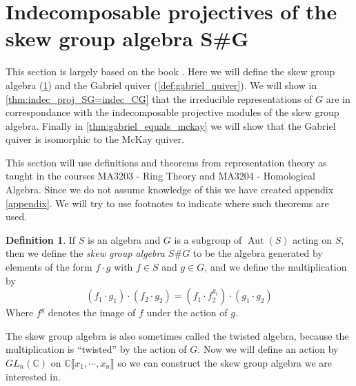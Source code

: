 \documentclass[11pt, a4paper, english]{article}
\theoremstyle{definition}
\newtheorem{defin}[theorem]{Definition}
\newcommand{\C}{\mathbb{C}}
\DeclareMathOperator{\Aut}{Aut}
\begin{document}
\section{Indecomposable projectives of the skew group algebra S\#G}
This section is largely based on the book \cite{CMR}. Here we will define the skew group algebra (\cref{def:skew_group_algebra}) and the Gabriel quiver (\cref{def:gabriel_quiver}). We will show in \cref{thm:indec_proj_SG=indec_CG} that the irreducible representations of $G$ are in correspondance with the indecomposable projective modules of the skew group algebra. Finally in \cref{thm:gabriel_equals_mckay} we will show that the Gabriel quiver is isomorphic to the McKay quiver.

This section will use definitions and theorems from representation theory as taught in the courses MA3203 - Ring Theory and MA3204 - Homological Algebra. Since we do not assume knowledge of this we have created appendix \ref{appendix}. We will try to use footnotes to indicate where such theorems are used.

\begin{defin}
\label{def:skew_group_algebra}
If $S$ is an algebra and $G$ is a subgroup of $\Aut(S)$ acting on $S$, then we define the \textit{skew group algebra $S\#G$} to be the algebra generated by elements of the form $f \cdot g$ with $f \in S$ and $g \in G$, and we define the multiplication by
$$ (f_1 \cdot g_1) \cdot (f_2 \cdot g_2) = (f_1 \cdot f_2^{g_1}) \cdot (g_1 \cdot g_2) $$
Where $f^g$ denotes the image of $f$ under the action of $g$.
\iffalse
If $G$ is a subgroup of $GL_n(\C)$, we can extend the group action of $G$ on $\C^n$ to $\C\llbracket x_1, \cdots, x_n\rrbracket$. More explicitly $G$ acts on $x_i$ as it would the $i$th basis vector of $\C^n$, and acts on products and sums by acting on each component separately. We then define the \textit{skew group algebra $\C \llbracket x_1, \cdots, x_n \rrbracket \# G$} to be the algebra generated by elements of the form $f \cdot g$ with $f \in \C\llbracket x_1, \cdots, x_n\rrbracket$ and $g \in G$, and we define the multiplication by
$$ (f_1 \cdot g_1) \cdot (f_2 \cdot g_2) = (f_1 \cdot f_2^{g_1}) \cdot (g_1 \cdot g_2) $$
Where $f^g$ denotes the image of $f$ under the action of $g$.
\fi
\end{defin}

The skew group algebra is also sometimes called the twisted algebra, because the multiplication is ``twisted'' by the action of $G$. Now we will define an action by $GL_n(\C)$ on $\C \llbracket x_1, \cdots, x_n \rrbracket$ so we can construct the skew group algebra we are interested in.
\end{document}
